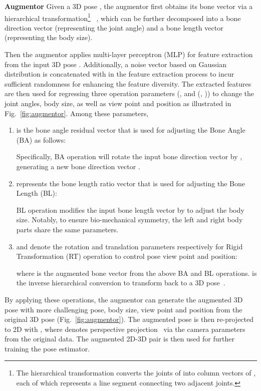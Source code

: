 \documentclass[final]{cvpr}
\newcommand{\myparagraph}[1]{{ \noindent \bf #1}}
\begin{document}
\myparagraph{Augmentor}
Given a 3D pose
, the augmentor first obtains its bone vector  via a hierarchical transformation\footnote{The hierarchical transformation converts the  joints of  into  column vectors of , each of which represents a line segment connecting two adjacent joints.}  ~\cite{wandt2019repnet,Li_2020_CVPR},   which can be further decomposed into a bone direction vector  (representing the joint angle)  and a bone length vector  (representing the body size).  


Then the augmentor applies  multi-layer perceptron (MLP) 
for feature extraction from the input 3D pose .
Additionally, a noise vector based on Gaussian distribution  
is concatenated with  in the feature extraction process to incur sufficient randomness for enhancing the feature diversity. 
The extracted features are then used for regressing three operation parameters (,  and (, )) to change the joint angles, body size, as well as view point and position as illustrated in Fig.~\ref{fig:augmentor}. Among these parameters,
\begin{enumerate} [1)]
\item   is the bone angle residual vector that is used for adjusting the Bone Angle (BA) as follows:
 
Specifically, BA operation will rotate the input bone direction vector  by , generating a new bone direction vector .

\item  {represents the bone length ratio vector} that is used for adjusting the {Bone Length (BL)}:
 
BL operation modifies the input bone length vector  by  to adjust the body size. Notably, to ensure bio-mechanical symmetry, the left and right body parts share the same parameters.

\item   and  denote the rotation and translation parameters respectively for Rigid Transformation (RT) operation to control pose view point and position:
 
where  is the augmented bone vector from the above BA and BL operations.  is the inverse hierarchical conversion to transform  back to a 3D pose~\cite{wandt2019repnet,Li_2020_CVPR}.
\end{enumerate}
By applying these operations, the augmentor can generate the augmented 3D pose  with more challenging pose, body size, view point and position from the original 3D pose  (Fig.~\ref{fig:augmentor}).
The augmented pose is then re-projected to 2D with , where  denotes perspective projection~\cite{Hartley2003MVG} via the camera parameters from the original data.
The augmented  2D-3D pair  is then used for further training the pose estimator. 
\end{document}
